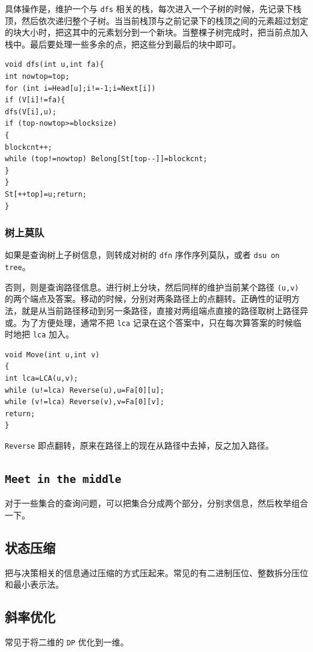 \documentclass[UTF-8]{ctexart}
\begin{document}
具体操作是，维护一个与 \texttt{dfs} 相关的栈，每次进入一个子树的时候，先记录下栈顶，然后依次递归整个子树。当当前栈顶与之前记录下的栈顶之间的元素超过划定的块大小时，把这其中的元素划分到一个新块。当整棵子树完成时，把当前点加入栈中。最后要处理一些多余的点，把这些分到最后的块中即可。
\begin{verbatim}
void dfs(int u,int fa){
int nowtop=top;
for (int i=Head[u];i!=-1;i=Next[i])
if (V[i]!=fa){
dfs(V[i],u);
if (top-nowtop>=blocksize)
{
blockcnt++;
while (top!=nowtop) Belong[St[top--]]=blockcnt;
}
}
St[++top]=u;return;
}
\end{verbatim}

\subsubsection{树上莫队}
如果是查询树上子树信息，则转成对树的 \texttt{dfn} 序作序列莫队，或者 \texttt{dsu on tree}。

否则，则是查询路径信息。进行树上分块，然后同样的维护当前某个路径 \texttt{(u,v)} 的两个端点及答案。移动的时候，分别对两条路径上的点翻转。正确性的证明方法，就是从当前路径移动到另一条路径，直接对两组端点直接的路径取树上路径异或。为了方便处理，通常不把 \texttt{lca} 记录在这个答案中，只在每次算答案的时候临时地把 \texttt{lca} 加入。

\begin{verbatim}
void Move(int u,int v)
{
int lca=LCA(u,v);
while (u!=lca) Reverse(u),u=Fa[0][u];
while (v!=lca) Reverse(v),v=Fa[0][v];
return;
}
\end{verbatim}
\texttt{Reverse} 即点翻转，原来在路径上的现在从路径中去掉，反之加入路径。

\subsection{\texttt{Meet in the middle}}
对于一些集合的查询问题，可以把集合分成两个部分，分别求信息，然后枚举组合一下。

\subsection{状态压缩}
把与决策相关的信息通过压缩的方式压起来。常见的有二进制压位、整数拆分压位和最小表示法。

\subsection{斜率优化}
常见于将二维的 \texttt{DP} 优化到一维。
\end{document}
